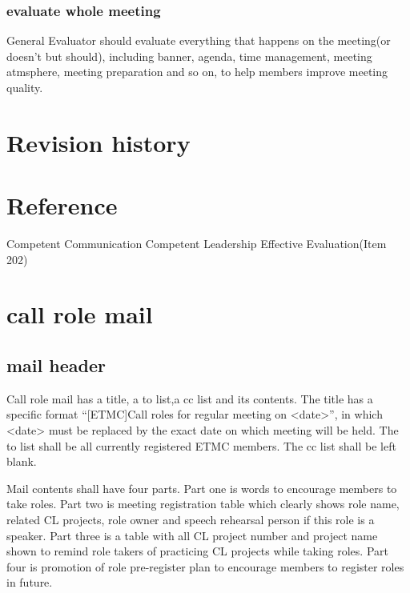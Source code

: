 \subsubsection{evaluate whole meeting}
General Evaluator should evaluate everything that happens on the meeting(or doesn't but
should), including banner, agenda, time management, meeting atmsphere, meeting preparation
and so on, to help members improve meeting quality.

\section{Revision history}
\section{Reference}


Competent Communication
Competent Leadership
Effective Evaluation(Item 202)


\section{call role mail}
\subsection{mail header}
Call role mail has a title, a to list,a cc list and its contents. The title has a 
specific format ``[ETMC]Call roles for regular meeting on <date>'', in which 
<date> must be replaced by the exact date on which meeting will be held. The to list 
shall be all currently registered ETMC members. The cc list shall be left blank.

Mail contents shall have four parts. Part one is words to encourage members to 
take roles. Part two is meeting registration table which clearly shows role name, 
related CL projects, role owner and speech rehearsal person if this role is a speaker. 
Part three is a table with all CL project number and project name shown to remind 
role takers of practicing CL projects while taking roles. Part four is promotion 
of role pre-register plan to encourage members to register roles in future.



\bye
